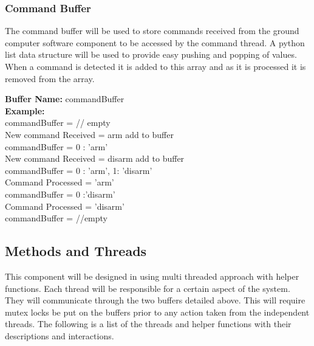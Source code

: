 \documentclass[10pt,draftclsnofoot,onecolumn,compsoc]{IEEEtran}
\begin{document}
\subsubsection{Command Buffer}
The command buffer will be used to store commands received from the ground computer software component to be accessed by the command thread. A python list data structure will be used to provide easy pushing and popping of values. When a command is detected it is added to this array and as it is processed it is removed from the array.\par
{\bf Buffer Name:} commandBuffer \\
{\bf Example:}\\
commandBuffer = {} // empty \\
New command Received = arm add to buffer \\
commandBuffer = {0 : 'arm'} \\
New command Received = disarm add to buffer \\
commandBuffer = {0 : 'arm', 1:  'disarm'} \\
Command Processed = 'arm' \\
commandBuffer = { 0 :'disarm'} \\
Command Processed = 'disarm' \\
commandBuffer = {} //empty \\

 
\subsection{Methods and Threads}
This component will be designed in using multi threaded approach with helper functions. Each thread will be responsible for a certain aspect of the system. They will communicate through the two buffers detailed above. This will require mutex locks be put on the buffers prior to any action taken from the independent threads. The following is a list of the threads and helper functions with their descriptions and interactions.
\end{document}
